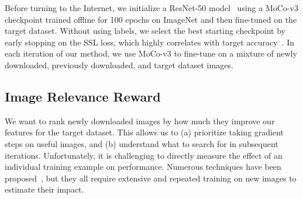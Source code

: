 
Before turning to the Internet, we initialize a ResNet-50 model~\cite{he2016deep} using a MoCo-v3 checkpoint trained offline for 100 epochs on ImageNet and then fine-tuned on the target dataset. Without using labels, we select the best starting checkpoint by early stopping on the SSL loss, which highly correlates with target accuracy~\cite{li2022understanding}.
In each iteration of our method, we use MoCo-v3 to fine-tune on a mixture of newly downloaded, previously downloaded, and target dataset images.



\subsection{Image Relevance Reward}
\label{subsec:image_rel_reward}
We want to rank newly downloaded images by how much they improve our features for the target dataset. This allows us to (a) prioritize taking gradient steps on useful images, and (b) understand what to search for in subsequent iterations. Unfortunately, it is challenging to directly measure the effect of an individual training example on performance. Numerous techniques have been proposed~\cite{koh2017understanding,feldman2020neural,paul2021deep,ilyas2022datamodels}, but they all require extensive and repeated training on new images to estimate their impact. 

